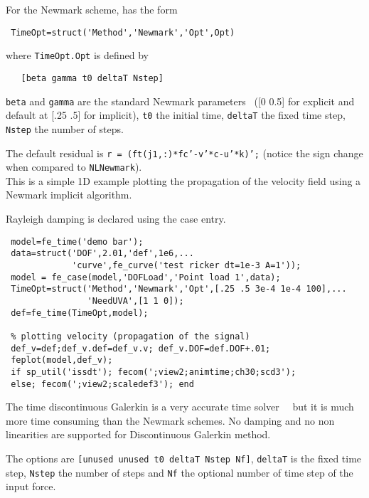 For the Newmark scheme, {} has the form
\begin{verbatim}
 TimeOpt=struct('Method','Newmark','Opt',Opt)
\end{verbatim}

where {\tt TimeOpt.Opt} is defined by
\begin{verbatim}
   [beta gamma t0 deltaT Nstep]
\end{verbatim}


{\tt beta} and {\tt gamma} are the standard Newmark parameters~ ([0 0.5] for explicit and default at [.25 .5] for implicit), {\tt t0} the initial time, {\tt deltaT} the fixed time step, {\tt Nstep} the number of steps.

The default residual is {\tt r = (ft(j1,:)*fc'-v'*c-u'*k)';} (notice the sign change when compared to {\tt NLNewmark}). \\

This is a simple 1D example plotting the propagation of the velocity field using a Newmark implicit algorithm.\begin{SDT} Rayleigh damping is declared using the  case entry.\end{SDT}

\begin{verbatim}
 model=fe_time('demo bar'); 
 data=struct('DOF',2.01,'def',1e6,...
             'curve',fe_curve('test ricker dt=1e-3 A=1'));
 model = fe_case(model,'DOFLoad','Point load 1',data);
 TimeOpt=struct('Method','Newmark','Opt',[.25 .5 3e-4 1e-4 100],...
                'NeedUVA',[1 1 0]);
 def=fe_time(TimeOpt,model);

 % plotting velocity (propagation of the signal)
 def_v=def;def_v.def=def_v.v; def_v.DOF=def.DOF+.01;
 feplot(model,def_v);
 if sp_util('issdt'); fecom(';view2;animtime;ch30;scd3');
 else; fecom(';view2;scaledef3'); end
\end{verbatim}%



The time discontinuous Galerkin is a very accurate time solver~~ but it is much more time consuming than the Newmark schemes.
No damping and no non linearities are supported for Discontinuous Galerkin method.

The options are {\tt [unused unused t0 deltaT  Nstep Nf]}, 
{\tt deltaT} is the fixed time step, {\tt Nstep} the number of steps and {\tt Nf} the optional number of time step of the input force.
  
